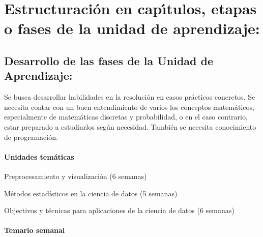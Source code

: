 \section{Estructuraci\'{o}n en cap\'{\i}tulos, etapas o fases de la unidad de
  aprendizaje:}

\subsection{Desarrollo de las fases de la Unidad de Aprendizaje:}

\quad

Se busca desarrollar habilidades en la resoluci\'{o}n en casos
pr\'{a}cticos concretos. Se necesita contar con un buen entendimiento
de varios los conceptos matem\'{a}ticos, especialmente de
matem\'{a}ticas discretas y probabilidad, o en el caso contrario,
estar preparado a estudiarlos seg\'{u}n necesidad. Tambi\'{e}n se
necesita conocimiento de programaci\'{o}n.

\paragraph{Unidades tem\'{a}ticas}

\begin{description}[itemsep=-2pt]
\item[U1]{Preprocesamiento y visualizaci\'{o}n (6 semanas)}
\item[U2]{M\'{e}todos estad\'{i}sticos en la ciencia de datos (5 semanas)}
\item[U3]{Objectivos y t\'{e}cnicas para aplicaciones de la ciencia de
    datos (6 semanas)}
\end{description}



\newpage

\paragraph{Temario semanal}

